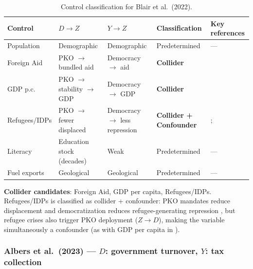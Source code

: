 \documentclass[
]{article}
\begin{document}
\begin{table}[H]
\centering
\small
\caption{Control classification for Blair et al.\ (2022).}
\begin{tabular}{llllp{3cm}}
\toprule
Control & $D \to Z$ & $Y \to Z$ & Classification & Key references \\
\midrule
Population & Demographic & Demographic & Predetermined & --- \\
Foreign Aid & PKO $\to$ bundled aid & Democracy $\to$ aid & \textbf{Collider} & \citet{bermeo2016} \\
GDP p.c. & PKO $\to$ stability $\to$ GDP & Democracy $\to$ GDP & \textbf{Collider} & \citet{acemoglu_etal2019} \\
Refugees/IDPs & PKO $\to$ fewer displaced & Democracy $\to$ less repression & \textbf{Collider + Confounder} & \citet{costalli_etal2024}; \citet{moore_shellman2004} \\
Literacy & Education stock (decades) & Weak & Predetermined & --- \\
Fuel exports & Geological & Geological & Predetermined & --- \\
\bottomrule
\end{tabular}
\end{table}

\textbf{Collider candidates}: Foreign Aid, GDP per capita,
Refugees/IDPs. Refugees/IDPs is classified as collider + confounder: PKO
mandates reduce displacement \citep[$D \to Z$;][]{costalli_etal2024} and
democratization reduces refugee-generating repression
\citep[$Y \to Z$;][]{moore_shellman2004}, but refugee crises also
trigger PKO deployment (\(Z \to D\)), making the variable simultaneously
a confounder (as with GDP per capita in \citealt{rogowski_etal2022}).

\subsubsection{\texorpdfstring{Albers et al.~(2023) --- \(D\):
government turnover, \(Y\): tax
collection}{Albers et al.~(2023) --- D: government turnover, Y: tax collection}}\label{albers-et-al.-2023-d-government-turnover-y-tax-collection}
\end{document}

